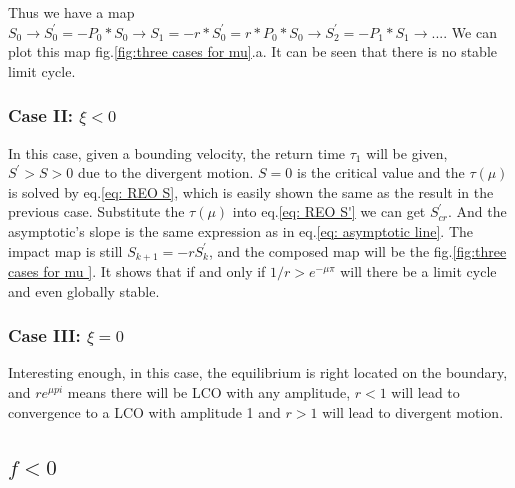 \documentclass{article}
\begin{document}
Thus we have a map $S_0\rightarrow S^{'}_0=-P_0*S_0 \rightarrow S_1=-r*S^{'}_0=r*P_0*S_0\rightarrow S^{'}_2=-P_1*S_1\rightarrow ...$. We can plot this map fig.\ref{fig:three cases for mu}.a. It can be seen that there is no stable limit cycle.

\subsubsection{Case II: $\xi<0$}


In this case,  given a bounding velocity, the return time $\tau_1$ will be given, $S^{'}>S>0$ due to the divergent motion.  $S=0$ is the critical value and the $\tau(\mu)$
is solved by eq.\ref{eq: REO S}, which is easily shown the same as the result in the previous case. Substitute the $\tau(\mu)$ into eq.\ref{eq: REO S'} we can get $S^{'}_{cr}$. And the asymptotic's slope is the same expression as in eq.\ref{eq: asymptotic line}. The impact map is still $S_{k+1}=-rS^{'}_{k}$, and the composed map will be the fig.\ref{fig:three cases for mu }. It shows that if and only if $1/r>e^{-\mu \pi}$ will there be a limit cycle and even globally stable.
\subsubsection{Case III: $\xi=0$}

Interesting enough, in this case, the equilibrium is right located on the boundary, and  $re^{\mu pi}$ means there will be LCO with any amplitude, $r<1$ will lead to convergence to a LCO with amplitude 1 and $r>1$ will lead to divergent motion.

\subsection{$f<0$}
\end{document}
